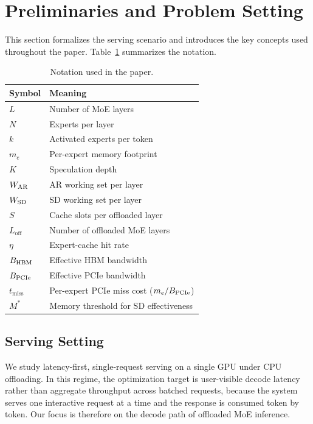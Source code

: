 \section{Preliminaries and Problem Setting}
\label{sec:background}

This section formalizes the serving scenario and introduces the key concepts used throughout the paper. Table~\ref{tab:notation} summarizes the notation.

\begin{table}[t]
\centering
\caption{Notation used in the paper.}
\label{tab:notation}
\small
\begin{tabular}{ll}
\toprule
Symbol & Meaning \\
\midrule
$L$ & Number of MoE layers \\
$N$ & Experts per layer \\
$k$ & Activated experts per token \\
$m_e$ & Per-expert memory footprint \\
$K$ & Speculation depth \\
$W_{\mathrm{AR}}$ & AR working set per layer \\
$W_{\mathrm{SD}}$ & SD working set per layer \\
$S$ & Cache slots per offloaded layer \\
$L_{\mathrm{off}}$ & Number of offloaded MoE layers \\
$\eta$ & Expert-cache hit rate \\
$B_{\mathrm{HBM}}$ & Effective HBM bandwidth \\
$B_{\mathrm{PCIe}}$ & Effective PCIe bandwidth \\
$t_{\mathrm{miss}}$ & Per-expert PCIe miss cost ($m_e/B_{\mathrm{PCIe}}$) \\
$M^*$ & Memory threshold for SD effectiveness \\
\bottomrule
\end{tabular}
\end{table}

\subsection{Serving Setting}

We study latency-first, single-request serving on a single GPU under CPU offloading. In this regime, the optimization target is user-visible decode latency rather than aggregate throughput across batched requests, because the system serves one interactive request at a time and the response is consumed token by token. Our focus is therefore on the decode path of offloaded MoE inference.

